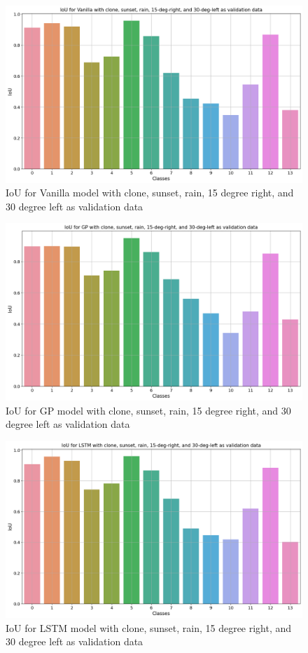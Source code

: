 	\begin{figure}
		\centering
	
		\includegraphics[width=12cm]{images/iou_vanilla_vkitti_five.png}
		\caption{IoU for Vanilla model with clone, sunset, rain, 15 degree right, and 30 degree left as validation data}
		\label{fig:performance_metric_unet1}
	\end{figure}
	
	\begin{figure}
		\centering
		
		\includegraphics[width=12cm]{images/IoU_vkitti_GP_five.png}
		\caption{IoU for GP model with clone, sunset, rain, 15 degree right, and 30 degree left as validation data}
		\label{fig:performance_metric_unet2}
	\end{figure}

	\begin{figure}
		\centering
	
		\includegraphics[width=12cm]{images/IoU_vkitti_lstm_five.png}
		\caption{IoU for LSTM model with clone, sunset, rain, 15 degree right, and 30 degree left as validation data}
		\label{fig:performance_metric_unet3}
	\end{figure}

